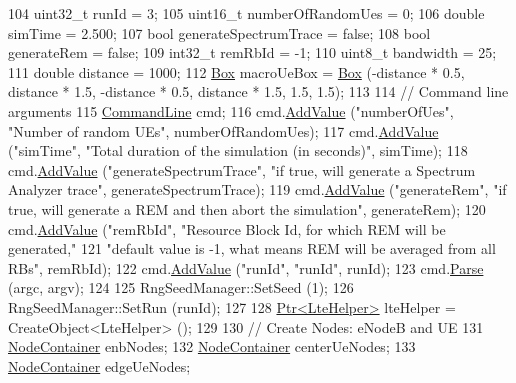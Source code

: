 \begin{DoxyCode}
104   uint32\_t runId = 3;
105   uint16\_t numberOfRandomUes = 0;
106   \textcolor{keywordtype}{double} simTime = 2.500;
107   \textcolor{keywordtype}{bool} generateSpectrumTrace = \textcolor{keyword}{false};
108   \textcolor{keywordtype}{bool} generateRem = \textcolor{keyword}{false};
109   int32\_t remRbId = -1;
110   uint8\_t bandwidth = 25;
111   \textcolor{keywordtype}{double} distance = 1000;
112   \hyperlink{classns3_1_1Box}{Box} macroUeBox = \hyperlink{classns3_1_1Box}{Box} (-distance * 0.5, distance * 1.5, -distance * 0.5, distance * 1.5, 1.5, 1.5);
113 
114   \textcolor{comment}{// Command line arguments}
115   \hyperlink{classns3_1_1CommandLine}{CommandLine} cmd;
116   cmd.\hyperlink{classns3_1_1CommandLine_addcfb546c7ad4c8bd0965654d55beb8e}{AddValue} (\textcolor{stringliteral}{"numberOfUes"}, \textcolor{stringliteral}{"Number of random UEs"}, numberOfRandomUes);
117   cmd.\hyperlink{classns3_1_1CommandLine_addcfb546c7ad4c8bd0965654d55beb8e}{AddValue} (\textcolor{stringliteral}{"simTime"}, \textcolor{stringliteral}{"Total duration of the simulation (in seconds)"}, simTime);
118   cmd.\hyperlink{classns3_1_1CommandLine_addcfb546c7ad4c8bd0965654d55beb8e}{AddValue} (\textcolor{stringliteral}{"generateSpectrumTrace"}, \textcolor{stringliteral}{"if true, will generate a Spectrum Analyzer trace"}, 
      generateSpectrumTrace);
119   cmd.\hyperlink{classns3_1_1CommandLine_addcfb546c7ad4c8bd0965654d55beb8e}{AddValue} (\textcolor{stringliteral}{"generateRem"}, \textcolor{stringliteral}{"if true, will generate a REM and then abort the simulation"}, 
      generateRem);
120   cmd.\hyperlink{classns3_1_1CommandLine_addcfb546c7ad4c8bd0965654d55beb8e}{AddValue} (\textcolor{stringliteral}{"remRbId"}, \textcolor{stringliteral}{"Resource Block Id, for which REM will be generated,"}
121                 \textcolor{stringliteral}{"default value is -1, what means REM will be averaged from all RBs"}, remRbId);
122   cmd.\hyperlink{classns3_1_1CommandLine_addcfb546c7ad4c8bd0965654d55beb8e}{AddValue} (\textcolor{stringliteral}{"runId"}, \textcolor{stringliteral}{"runId"}, runId);
123   cmd.\hyperlink{classns3_1_1CommandLine_a5c10b85b3207e5ecb48d907966923156}{Parse} (argc, argv);
124 
125   RngSeedManager::SetSeed (1);
126   RngSeedManager::SetRun (runId);
127 
128   \hyperlink{classns3_1_1Ptr}{Ptr<LteHelper>} lteHelper = CreateObject<LteHelper> ();
129 
130   \textcolor{comment}{// Create Nodes: eNodeB and UE}
131   \hyperlink{classns3_1_1NodeContainer}{NodeContainer} enbNodes;
132   \hyperlink{classns3_1_1NodeContainer}{NodeContainer} centerUeNodes;
133   \hyperlink{classns3_1_1NodeContainer}{NodeContainer} edgeUeNodes;

\end{DoxyCode}
